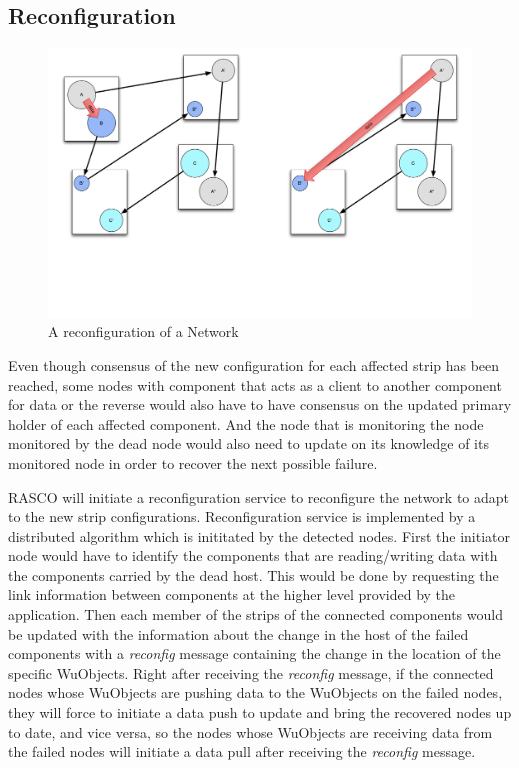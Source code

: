 \subsection{Reconfiguration}
\label{s:reconfig}

\begin{figure}[h!]
\caption{A reconfiguration of a Network}
\label{fig:reconfig-network}
\centering
    \includegraphics[width=\linewidth]{figures/reconfig-network}
\end{figure}

Even though consensus of the new configuration for each affected strip has been
reached, some nodes with component that acts as a client to another component
for data or the reverse would also have to have consensus on the updated
primary holder of each affected component. And the node that is monitoring the
node monitored by the dead node would also need to update on its knowledge of
its monitored node in order to recover the next possible failure.

RASCO will initiate a reconfiguration service to reconfigure the network to adapt
to the new strip configurations. Reconfiguration service is implemented by
a distributed algorithm which is inititated by the detected nodes. First the
initiator node would have to identify the components that are reading/writing
data with the components carried by the dead host. This would be done by
requesting the link information between components at the higher level provided
by the application. Then each member of the strips of the connected components
would be updated with the information about the change in the host of the
failed components with a \emph{reconfig} message containing the change in the
location of the specific WuObjects. Right after receiving the \emph{reconfig}
message, if the connected nodes whose WuObjects are pushing data to the
WuObjects on the failed nodes, they will force to initiate a data push to
update and bring the recovered nodes up to date, and vice versa, so the nodes
whose WuObjects are receiving data from the failed nodes will initiate a data
pull after receiving the \emph{reconfig} message.

